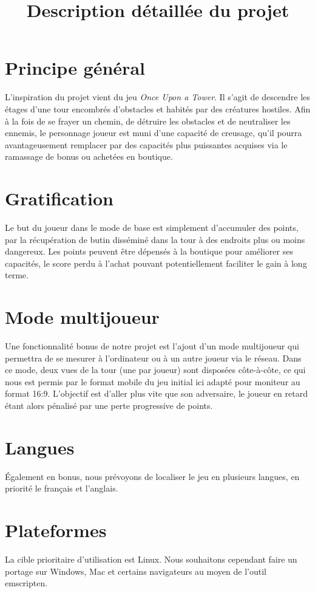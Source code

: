 \documentclass[10pt]{article}
\title{Description détaillée du projet}
\date{}
\begin{document}
\maketitle

\section{Principe général}
L’inspiration du projet vient du jeu \textit{Once Upon a Tower}. Il s’agit de descendre les étages d’une tour encombrés d’obstacles et habités par des créatures hostiles.
Afin à la fois de se frayer un chemin, de détruire les obstacles et de neutraliser les ennemis, le personnage joueur est muni d’une capacité de creusage, qu’il pourra avantageusement remplacer par des capacités plus puissantes acquises via le ramassage de bonus ou achetées en boutique.

\section{Gratification}
Le but du joueur dans le mode de base est simplement d’accumuler des points, par la récupération de butin disséminé dans la tour à des endroits plus ou moins dangereux.
Les points peuvent être dépensés à la boutique pour améliorer ses capacités, le score perdu à l’achat pouvant potentiellement faciliter le gain à long terme.

\section{Mode multijoueur}
Une fonctionnalité bonus de notre projet est l’ajout d’un mode multijoueur qui permettra de se mesurer à l’ordinateur ou à un autre joueur via le réseau.
Dans ce mode, deux vues de la tour (une par joueur) sont disposées côte-à-côte, ce qui nous est permis par le format mobile du jeu initial ici adapté pour moniteur au format 16:9.
L’objectif est d’aller plus vite que son adversaire, le joueur en retard étant alors pénalisé par une perte progressive de points.

\section{Langues}
Également en bonus, nous prévoyons de localiser le jeu en plusieurs langues, en priorité le français et l’anglais.

\section{Plateformes}
La cible prioritaire d’utilisation est Linux. Nous souhaitons cependant faire un portage sur Windows, Mac et certains navigateurs au moyen de l’outil emscripten.
\end{document}
